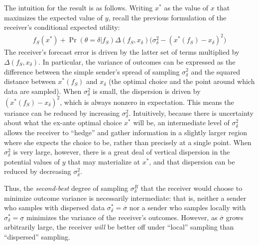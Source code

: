 \documentclass[11pt,dvipsnames]{article}
\begin{document}
The intuition for the result is as follows.
Writing $x^*$ as the value of $x$ that maximizes the expected value of $y$, recall the previous formulation of the receiver's conditional expected utility:
\begin{align*}
f_S(x^*) + \Pr(\theta=\delta|f_S)\Delta(f_S,x_\delta)\big(\sigma_\delta^2-(x^*(f_S)-x_\delta)^2\big)
\end{align*}
The receiver's forecast error is driven by the latter set of terms multiplied by $\Delta(f_S,x_\delta)$.
In particular, the variance of outcomes can be expressed as the difference between the simple sender's spread of sampling $\sigma_\delta^2$ and the squared distance between $x^*(f_S)$ and $x_\delta$ (the optimal choice and the point around which data are sampled).
When $\sigma_\delta^2$ is small, the dispersion is driven by $(x^*(f_S)-x_\delta)^2$, which is always nonzero in expectation. This means the variance can be reduced by increasing $\sigma_\delta^2$.
Intuitively, because there is uncertainty about what the ex-ante optimal choice $x^*$ will be, an intermediate level of $\sigma_\delta^2$ allows the receiver to ``hedge'' and gather information in a slightly larger region where she expects the choice to be, rather than precisely at a single point.
When $\sigma_\delta^2$ is very large, however, there is a great deal of vertical dispersion in the potential values of $y$ that may materialize at $x^*$, and that dispersion can be reduced by decreasing $\sigma_\delta^2$.

Thus, the \emph{second-best} degree of sampling $\sigma_\delta^R$ that the receiver would choose to minimize outcome variance is necessarily intermediate: that is, neither a sender who samples with dispersed data $\sigma_\delta^*=\overline{\sigma}$ nor a sender who samples locally with $\sigma_\delta^*=\underline{\sigma}$ minimizes the variance of the receiver's outcomes.
However, as $\overline{\sigma}$ grows arbitrarily large, the receiver \emph{will} be better off under ``local'' sampling than ``dispersed'' sampling.
\end{document}
